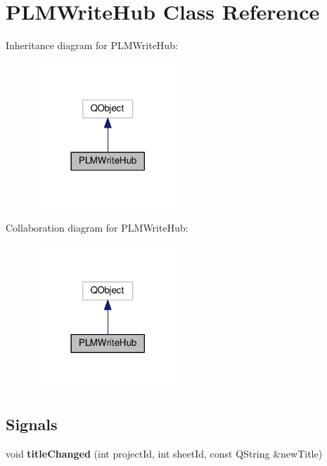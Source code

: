 \hypertarget{class_p_l_m_write_hub}{}\section{P\+L\+M\+Write\+Hub Class Reference}
\label{class_p_l_m_write_hub}


Inheritance diagram for P\+L\+M\+Write\+Hub\+:\nopagebreak
\begin{figure}[H]
\begin{center}
\leavevmode
\includegraphics[width=158pt]{class_p_l_m_write_hub__inherit__graph}
\end{center}
\end{figure}


Collaboration diagram for P\+L\+M\+Write\+Hub\+:\nopagebreak
\begin{figure}[H]
\begin{center}
\leavevmode
\includegraphics[width=158pt]{class_p_l_m_write_hub__coll__graph}
\end{center}
\end{figure}
\subsection*{Signals}
\begin{DoxyCompactItemize}
\item 
void {\bfseries title\+Changed} (int project\+Id, int sheet\+Id, const Q\+String \&new\+Title)\hypertarget{class_p_l_m_write_hub_a5226e205f467d69fdbbb9d16a8d01af8}{}\label{class_p_l_m_write_hub_a5226e205f467d69fdbbb9d16a8d01af8}

\end{DoxyCompactItemize}
